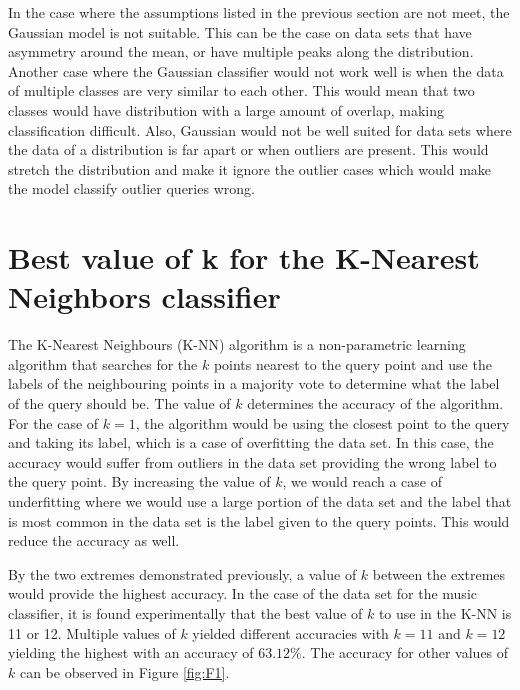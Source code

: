 \documentclass[11pt]{scrartcl}
\begin{document}
In the case where the assumptions listed in the previous section are not meet, the Gaussian model is not suitable. This can be the case on data sets that have asymmetry around the mean, or have multiple peaks along the distribution. Another case where the Gaussian classifier would not work well is when the data of multiple classes are very similar to each other. This would mean that two classes would have distribution with a large amount of overlap, making classification difficult. Also, Gaussian would not be well suited for data sets where the data of a distribution is far apart or when outliers are present. This would stretch the distribution and make it ignore the outlier cases which would make the model classify outlier queries wrong.

\section{Best value of k for the K-Nearest Neighbors classifier}

The K-Nearest Neighbours (K-NN) algorithm is a non-parametric learning algorithm that searches for the $k$ points nearest to the query point and use the labels of the neighbouring points in a majority vote to determine what the label of the query should be. The value of $k$ determines the accuracy of the algorithm. For the case of $k=1$, the algorithm would be using the closest point to the query and taking its label, which is a case of overfitting the data set. In this case, the accuracy would suffer from outliers in the data set providing the wrong label to the query point. By increasing the value of $k$, we would reach a case of underfitting where we would use a large portion of the data set and the label that is most common in the data set is the label given to the query points. This would reduce the accuracy as well.

By the two extremes demonstrated previously, a value of $k$ between the extremes would provide the highest accuracy. In the case of the data set for the music classifier, it is found experimentally that the best value of $k$ to use in the K-NN is 11 or 12. Multiple values of $k$ yielded different accuracies with $k=11$ and $k=12$ yielding the highest with an accuracy of $63.12\%$. The accuracy for other values of $k$ can be observed in Figure \ref{fig:F1}.
\end{document}
